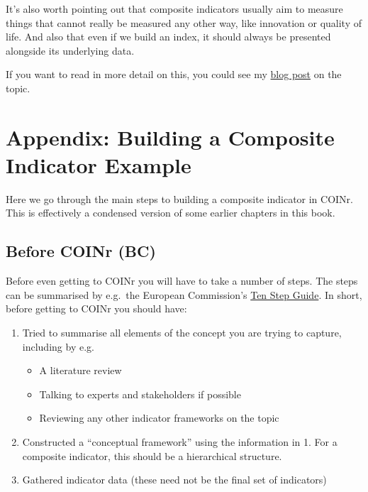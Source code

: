 \documentclass[
]{book}
\providecommand{\tightlist}{%
  \setlength{\itemsep}{0pt}\setlength{\parskip}{0pt}}
\begin{document}
It's also worth pointing out that composite indicators usually aim to measure things that cannot really be measured any other way, like innovation or quality of life. And also that even if we build an index, it should always be presented alongside its underlying data.

If you want to read in more detail on this, you could see my \href{https://www.bluefoxdata.eu/blog/2020-11-17-whycompositeindicators/}{blog post} on the topic.

\hypertarget{appendix-building-a-composite-indicator-example}{%
\chapter{Appendix: Building a Composite Indicator Example}\label{appendix-building-a-composite-indicator-example}}

Here we go through the main steps to building a composite indicator in COINr. This is effectively a condensed version of some earlier chapters in this book.

\hypertarget{before-coinr-bc}{%
\section{Before COINr (BC)}\label{before-coinr-bc}}

Before even getting to COINr you will have to take a number of steps. The steps can be summarised by e.g.~the European Commission's \href{https://knowledge4policy.ec.europa.eu/publication/your-10-step-pocket-guide-composite-indicators-scoreboards_en}{Ten Step Guide}. In short, before getting to COINr you should have:

\begin{enumerate}
\def\labelenumi{\arabic{enumi}.}
\tightlist
\item
  Tried to summarise all elements of the concept you are trying to capture, including by e.g.

  \begin{itemize}
  \tightlist
  \item
    A literature review
  \item
    Talking to experts and stakeholders if possible
  \item
    Reviewing any other indicator frameworks on the topic
  \end{itemize}
\item
  Constructed a ``conceptual framework'' using the information in 1. For a composite indicator, this should be a hierarchical structure.
\item
  Gathered indicator data (these need not be the final set of indicators)
\end{enumerate}
\end{document}
